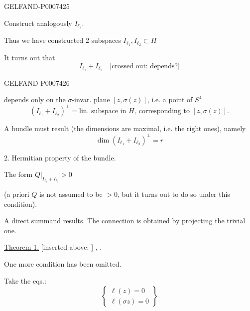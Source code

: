 \begin{GelfandAdjacentEvidence}{GELFAND-P000742}{5}


Construct analogously \(I_{\ell_2}\).

Thus we have constructed 2 subspaces \(I_{\ell_1},I_{\ell_2}\subset H\)

It turns out that
\[
I_{\ell_1}+I_{\ell_2}\quad \text{[crossed out: depends?]}
\]
\end{GelfandAdjacentEvidence}
\begin{GelfandAdjacentEvidence}{GELFAND-P000742}{6}

depends only on the \(\sigma\)-invar. plane \([z,\sigma(z)]\), i.e. a point of \(S^4\)
\[
(I_{\ell_1}+I_{\ell_2})^\perp
=\text{lin. subspace in }H,\ \text{corresponding to }[z,\sigma(z)].
\]

 A bundle must result
(the dimensions are maximal, i.e. the right ones), namely
\begin{equation*}
\tag{19}
\dim(I_{\ell_1}+I_{\ell_2})^\perp=r
\end{equation*}

 2. Hermitian property of the bundle.

The form \(Q|_{I_{\ell_1}+I_{\ell_2}}>0\)

(a priori \(Q\) is not assumed to be \(>0\), but it turns out to do so under this condition).

A direct summand results. The connection is obtained by projecting the trivial one.

\underline{Theorem 1.}  [inserted above: ]
, .
\end{GelfandAdjacentEvidence}


One more condition has been omitted.

Take the eqs.:
\[
\left\{\begin{array}{l}
\ell(z)=0\\
\ell(\sigma z)=0
\end{array}\right\}
\]


